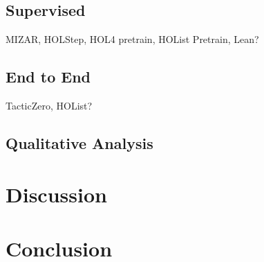 \documentclass[letterpaper]{article} %
\begin{document}
    \subsection{Supervised}
    MIZAR, HOLStep, HOL4 pretrain, HOList Pretrain, Lean?

    \subsection{End to End}
    TacticZero, HOList?

    \subsection{Qualitative Analysis}

    \section{Discussion}

    \section{Conclusion}
\end{document}

